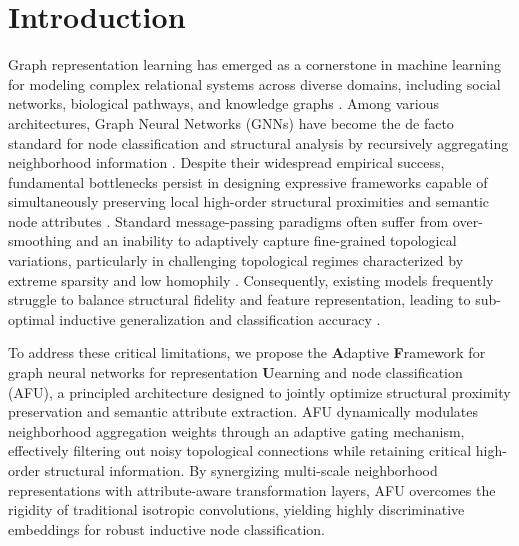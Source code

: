 \documentclass[10pt,twocolumn]{article}
\begin{document}
\section{Introduction}
Graph representation learning has emerged as a cornerstone in machine learning for modeling complex relational systems across diverse domains, including social networks, biological pathways, and knowledge graphs \cite{ref_6, ref_11}. Among various architectures, Graph Neural Networks (GNNs) have become the de facto standard for node classification and structural analysis by recursively aggregating neighborhood information \cite{target_ref, ref_17}. Despite their widespread empirical success, fundamental bottlenecks persist in designing expressive frameworks capable of simultaneously preserving local high-order structural proximities and semantic node attributes \cite{ref_2, ref_4}. Standard message-passing paradigms often suffer from over-smoothing and an inability to adaptively capture fine-grained topological variations, particularly in challenging topological regimes characterized by extreme sparsity and low homophily \cite{ref_3, ref_37}. Consequently, existing models frequently struggle to balance structural fidelity and feature representation, leading to sub-optimal inductive generalization and classification accuracy \cite{ref_8, ref_23}.

To address these critical limitations, we propose the \textbf{A}daptive \textbf{F}ramework for graph neural networks for representation \textbf{U}earning and node classification (\textsc{AFU}), a principled architecture designed to jointly optimize structural proximity preservation and semantic attribute extraction. \textsc{AFU} dynamically modulates neighborhood aggregation weights through an adaptive gating mechanism, effectively filtering out noisy topological connections while retaining critical high-order structural information. By synergizing multi-scale neighborhood representations with attribute-aware transformation layers, \textsc{AFU} overcomes the rigidity of traditional isotropic convolutions, yielding highly discriminative embeddings for robust inductive node classification.
\end{document}
